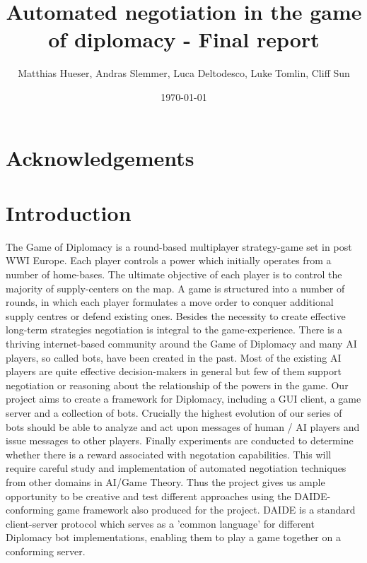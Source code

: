 \documentclass[11pt]{article}
\title{Automated negotiation in the game of diplomacy - Final report}
\author{Matthias Hueser, Andras Slemmer, Luca Deltodesco, Luke Tomlin, Cliff Sun}
\date{\today}
\begin{document}
\maketitle

\begin{Abstract}


\end{Abstract}

\tableofcontents

\section{Acknowledgements}

\section{Introduction}
The Game of Diplomacy is a round-based multiplayer strategy-game set in post WWI
Europe. Each player controls a power which initially operates from a number of 
home-bases. The ultimate objective of each player is to control the majority of
supply-centers on the map. A game is structured into a number of rounds, in which
each player formulates a move order to conquer additional supply centres or
defend existing ones. Besides the necessity to create effective long-term
strategies negotiation is integral to the game-experience. There is a thriving
internet-based community around the Game of Diplomacy and many AI players, so
called bots, have been created in the past. Most of the existing AI players are
quite effective decision-makers in general but few of them support negotiation
or reasoning about the relationship of the powers in the game. Our project aims
to create a framework for Diplomacy, including a GUI client, a game server and a
collection of bots. Crucially the highest evolution of our series
of bots should be able to analyze and act upon messages of human / AI players and
issue messages to other players. Finally experiments are conducted to determine whether
there is a reward associated with negotation capabilities. This will require
careful study and implementation of automated negotiation techniques from other 
domains in AI/Game Theory. Thus the project gives us ample opportunity to be
creative and test different approaches using the DAIDE-conforming game framework
also produced for the project. DAIDE is a standard client-server protocol which
serves as a 'common language' for different Diplomacy bot implementations, 
enabling them to play a game together on a conforming server.
\end{document}
